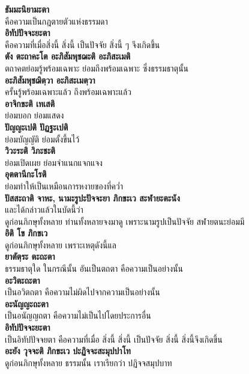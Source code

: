 \documentclass[12pt]{article}
\begin{document}
\textbf{ธัมมะนิยามะตา}\\
\indent คือความเป็นกฎตายตัวแห่งธรรมดา\\
\textbf{อิทัปปัจจะยะตา}\\
\indent คือความที่เมื่อสิ่งนี้ สิ่งนี้ เป็นปัจจัย สิ่งนี้ ๆ จึงเกิดขึ้น\\
\textbf{ตัง ตะถาคะโต อะภิสัมพุชฌะติ อะภิสะเมติ}\\
\indent ตถาคตย่อมรู้พร้อมเฉพาะ ย่อมถึงพร้อมเฉพาะ ซึ่งธรรมธาตุนั้น\\
\textbf{อะภิสัมพุชฌิตฺวา อะภิสะเมตฺวา}\\
\indent ครั้นรู้พร้อมเฉพาะแล้ว ถึงพร้อมเฉพาะแล้ว\\
\textbf{อาจิกขะติ เทเสติ}\\
\indent ย่อมบอก ย่อมแสดง\\
\textbf{ปัญญะเปติ ปัฏฐะเปติ}\\
\indent ย่อมบัญญัติ ย่อมตั้งขึ้นไว้\\
\textbf{วิวะระติ วิภะชะติ}\\
\indent ย่อมเปิดเผย ย่อมจำแนกแจกแจง\\
\textbf{อุตตานีกะโรติ}\\
\indent ย่อมทำให้เป็นเหมือนการหงายของที่คว่ำ\\
\textbf{ปัสสะถาติ จาหะ, นามะรูปะปัจจะยา ภิกขะเว สะฬายะตะนัง}\\
\indent และได้กล่าวแล้วในบัดนี้ว่า \\
\indent ดูก่อนภิกษุทั้งหลาย ท่านทั้งหลายจงมาดู เพราะนามรูปเป็นปัจจัย สฬายตนะย่อมมี\\
\textbf{อิติ โข ภิกขเว}\\
\indent ดูก่อนภิกษุทั้งหลาย เพราะเหตุดังนี้แล\\
\textbf{ยาตัตฺระ ตะถะตา}\\
\indent ธรรมธาตุใด ในกรณีนั้น อันเป็นตถตา คือความเป็นอย่างนั้น\\
\textbf{อะวิตะถะตา}\\
\indent เป็นอวิตถตา คือความไม่ผิดไปจากความเป็นอย่างนั้น\\
\textbf{อะนัญญะถะตา}\\
\indent เป็นอนัญญถตา คือความไม่เป็นไปโดยประการอื่น\\
\textbf{อิทัปปัจจะยะตา}\\
\indent เป็นอิทัปปัจจยตา คือความที่เมื่อ สิ่งนี้ สิ่งนี้ เป็นปัจจัย สิ่งนี้ สิ่งนี้จึงเกิดขึ้น\\
\textbf{อะยัง วุจจะติ ภิกขะเว ปะฏิจจะสะมุปปาโท}\\
\indent ดูก่อนภิกษุทั้งหลาย ธรรมนั้น เราเรียกว่า ปฏิจจสมุปบาท \\
\end{document}
